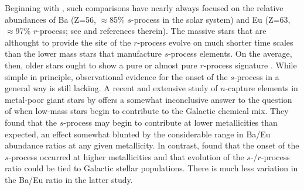 \documentclass[12pt,preprint]{aastex}
\begin{document}
Beginning with \citet{Spite1978}, such comparisons have nearly always focused on the relative abundances of Ba (Z=56, $\approx$85\% $s$-process in the solar system) and Eu (Z=63, $\approx$97\% $r$-process; see \citealt{Burris2000} and references therein).  The massive stars that are althought to provide the site of the $r$-process evolve on much shorter time scales than the lower mass stars that manufacture $s$-process elements.  On the average, then, older stars ought to show a pure or almost pure $r$-process signature \citep{Truran1981}.  While simple in principle, observational evidence for the onset of the $s$-process in a general way is still lacking.  A recent and extensive study of $n$-capture elements in metal-poor giant stars by \citet{Burris2000} offers a somewhat inconclusive answer to the question of when low-mass stars begin to contribute to the Galactic chemical mix.    They found that  the $s$-process may begin to contribute at lower metallicities than expected, an effect somewhat blunted by the considerable range in Ba/Eu abundance ratios at any given metallicity.   In contrast, \citet{Mashonkina2003} found that the onset of the $s$-process occurred at higher metallicities and that evolution of the $s$-/$r$-process ratio could be tied to Galactic stellar populations.  There is much less variation in the Ba/Eu ratio in the latter study.  
\end{document}
